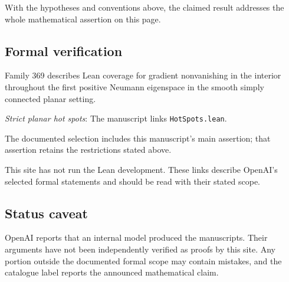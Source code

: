 \documentclass[11pt]{article}
\begin{document}
With the hypotheses and conventions above, the claimed result addresses the whole mathematical assertion on this page.

\subsection{Formal verification}
Family 369 describes Lean coverage for gradient nonvanishing in the interior throughout the first positive Neumann eigenspace in the smooth simply connected planar setting.

\textit{Strict planar hot spots}: The manuscript links \texttt{HotSpots.lean}.

The documented selection includes this manuscript’s main assertion; that assertion retains the restrictions stated above.

This site has not run the Lean development. These links describe OpenAI’s selected formal statements and should be read with their stated scope.

\subsection{Status caveat}
OpenAI reports that an internal model produced the manuscripts. Their arguments have not been independently verified as proofs by this site. Any portion outside the documented formal scope may contain mistakes, and the catalogue label reports the announced mathematical claim.
\end{document}
